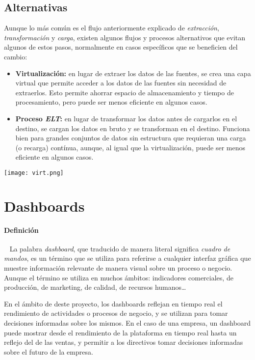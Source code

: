 \subsection{Alternativas}
Aunque lo más común es el flujo anteriormente explicado de \textit{extracción}, \textit{transformación} y
\textit{carga}, existen algunos flujos y procesos alternativos que evitan algunos de estos pasos, normalmente
en casos específicos que se beneficien del cambio:

\begin{itemize}
	\item \textbf{Virtualización:} en lugar de extraer los datos de las fuentes, se crea una capa virtual que
		permite acceder a los datos de las fuentes sin necesidad de extraerlos. Esto permite ahorrar espacio de
		almacenamiento y tiempo de procesamiento, pero puede ser menos eficiente en algunos casos.
	\item \textbf{Proceso \textit{ELT}:} en lugar de transformar los datos antes de cargarlos en el destino,
		se cargan los datos en bruto y se transforman en el destino. Funciona bien para grandes conjuntos de
		datos sin estructura que requieran una carga (o recarga) contínua, aunque, al igual que la virtualización,
		puede ser menos eficiente en algunos casos.
\end{itemize}

\begin{minipage}{\linewidth}
	\centering
	\texttt{[image: virt.png]}
\end{minipage}

\newpage{}
\section{Dashboards}\label{sec:dashboards}
\paragraph{Definición}~\cite{mier2023dashboards}
La palabra \textit{dashboard}, que traducido de manera literal significa \textit{cuadro de mandos},
es un término que se utiliza para referirse a cualquier interfaz gráfica que muestre información
relevante de manera visual sobre un proceso o negocio. Aunque el término se utiliza en
muchos ámbitos: indicadores comerciales, de producción, de marketing, de calidad, de recursos
humanos\ldots

En el ámbito de deste proyecto, los dashboards reflejan en tiempo real el rendimiento de
actividades o procesos de negocio, y se utilizan para tomar decisiones informadas sobre los
mismos. En el caso de una empresa, un dashboard puede mostrar desde el rendimiento de la
plataforma en tiempo real hasta un reflejo del de las ventas, y permitir a los directivos tomar
decisiones informadas sobre el futuro de la empresa.

